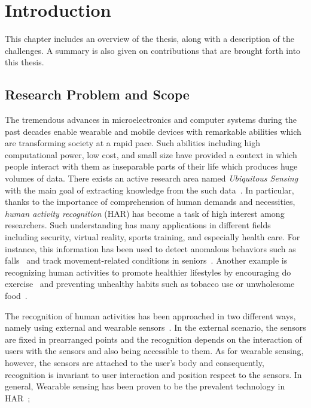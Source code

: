 \chapter{Introduction} \label{chap:introdcution}
This chapter includes an overview of the thesis, along with a description of the
challenges. A summary is also given on contributions that are brought forth into this
thesis.
\section{Research Problem and Scope}
The tremendous advances in microelectronics and computer systems during the past decades enable wearable and mobile devices with remarkable abilities which are transforming society at a rapid pace. Such abilities including high computational power, low cost, and small size have provided a context in which people interact with them as inseparable parts of their life which produces huge volumes of data. There exists an active research area named \emph{Ubiquitous Sensing} with the main goal of extracting
knowledge from the such data~\cite{perez2010g}. In particular, thanks to the importance of comprehension of human demands and necessities, \emph{human activity recognition} (HAR) has become a task of high interest among researchers. Such understanding has many applications in different fields including security, virtual reality, sports training, and especially health care. For 
instance, this information has been used to detect anomalous behaviors such as 
falls~\citep{luvstrek2009fall,tamura2009wearable,bianchi2010barometric} and track movement-related 
conditions in seniors~\citep{chen2014implementing}. Another example is recognizing human activities to promote healthier lifestyles by encouraging do exercise~\citep{lin2006fish,consolvo2008activity} and preventing unhealthy habits such as tobacco use or unwholesome food~\citep{sazonov2009automatic,sazonov2011rf}.      

The recognition of human activities has been approached in two different ways, namely using external and wearable sensors~\citep{lara2012survey}. In the external scenario, the sensors are fixed in prearranged points and the recognition depends on the interaction of users with the sensors and also being accessible to them. As for wearable sensing, however,  the sensors are attached to the user's body and consequently, recognition is invariant to user interaction and position respect to the sensors. In general, Wearable sensing has been proven to be the prevalent technology in HAR~\citep{banos2014window};  
 

